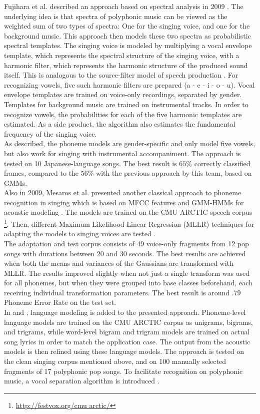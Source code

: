 \medskip
Fujihara et al. described an approach based on spectral analysis in 2009 \cite{fujihara_phonemes}. The underlying idea is that spectra of polyphonic music can be viewed as the weighted sum of two types of spectra: One for the singing voice, and one for the background music. This approach then models these two spectra as probabilistic spectral templates. The singing voice is modeled by multiplying a vocal envelope template, which represents the spectral structure of the singing voice, with a harmonic filter, which represents the harmonic structure of the produced sound itself. This is analogous to the source-filter model of speech production \cite{}. For recognizing vowels, five such harmonic filters are prepared (a - e - i - o - u). Vocal envelope templates are trained on voice-only recordings, separated by gender. Templates for background music are trained on instrumental tracks. In order to recognize vowels, the probabilities for each of the five harmonic templates are estimated. As a side product, the algorithm also estimates the fundamental frequency of the singing voice.\\
As described, the phoneme models are gender-specific and only model five vowels, but also work for singing with instrumental accompaniment. The approach is tested on 10 Japanese-language songs. The best result is $65\%$ correctly classified frames, compared to the $56\%$ with the previous approach by this team, based on GMMs. \\
\medskip
Also in 2009, Mesaros et al. presented another classical approach to phoneme recognition in singing which is based on MFCC features and GMM-HMMs for acoustic modeling \cite{Mesaros2009}. The models are trained on the CMU ARCTIC speech corpus \footnote{\url{http://festvox.org/cmu arctic/}}. Then, different Maximum Likelihood Linear Regression (MLLR) techniques for adapting the models to singing voices are tested \cite{mllr}.\\
The adaptation and test corpus consists of 49 voice-only fragments from 12 pop songs with durations between 20 and 30 seconds. The best results are achieved when both the means and variances of the Gaussians are transformed with MLLR. The results improved slightly when not just a single transform was used for all phonemes, but when they were grouped into base classes beforehand, each receiving individual transformation parameters. The best result is around $.79$ Phoneme Error Rate on the test set.\\
In \cite{Mesaros2010} and \cite{Mesaros2011}, language modeling is added to the presented approach. Phoneme-level language models are trained on the CMU ARCTIC corpus as unigrams, bigrams, and trigrams, while word-level bigram and trigram models are trained on actual song lyrics in order to match the application case. The output from the acoustic models is then refined using these language models. The approach is tested on the clean singing corpus mentioned above, and on 100 manually selected fragments of 17 polyphonic pop songs. To facilitate recognition on polyphonic music, a vocal separation algorithm is introduced \cite{virtanen_separation}.\\
